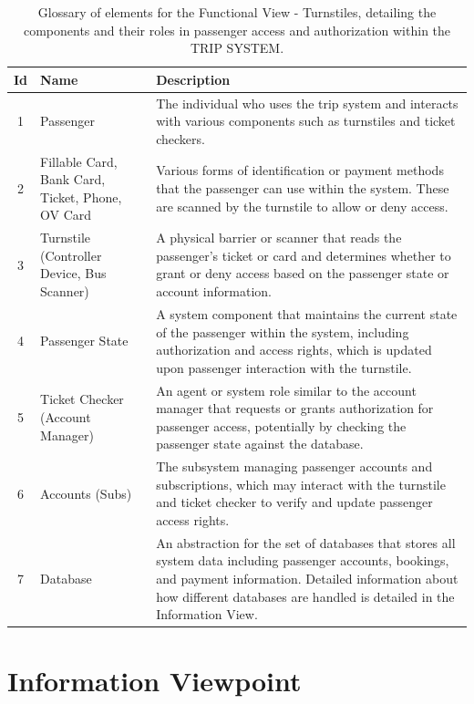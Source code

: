 \begin{table}[H]
    \centering
    \begin{tabular}{@{}clp{9cm}@{}} %
    \toprule
    \textbf{Id} & \textbf{Name} & \textbf{Description} \\
    \midrule
    1 & Passenger & The individual who uses the trip system and interacts with various components such as turnstiles and ticket checkers. \\
    2 & Fillable Card, Bank Card, Ticket, Phone, OV Card & Various forms of identification or payment methods that the passenger can use within the system. These are scanned by the turnstile to allow or deny access. \\
    3 & Turnstile (Controller Device, Bus Scanner) & A physical barrier or scanner that reads the passenger's ticket or card and determines whether to grant or deny access based on the passenger state or account information. \\
    4 & Passenger State & A system component that maintains the current state of the passenger within the system, including authorization and access rights, which is updated upon passenger interaction with the turnstile. \\
    5 & Ticket Checker (Account Manager) & An agent or system role similar to the account manager that requests or grants authorization for passenger access, potentially by checking the passenger state against the database. \\
    6 & Accounts (Subs) & The subsystem managing passenger accounts and subscriptions, which may interact with the turnstile and ticket checker to verify and update passenger access rights. \\
    7 & Database & An abstraction for the set of databases that stores all system data including passenger accounts, bookings, and payment information. Detailed information about how different databases are handled is detailed in the Information View.\\
    \bottomrule
    \end{tabular}
    \caption{Glossary of elements for the Functional View - Turnstiles, detailing the components and their roles in passenger access and authorization within the TRIP SYSTEM.}
    \label{tab:glossary_turnstiles}
\end{table}

\section{Information Viewpoint}

